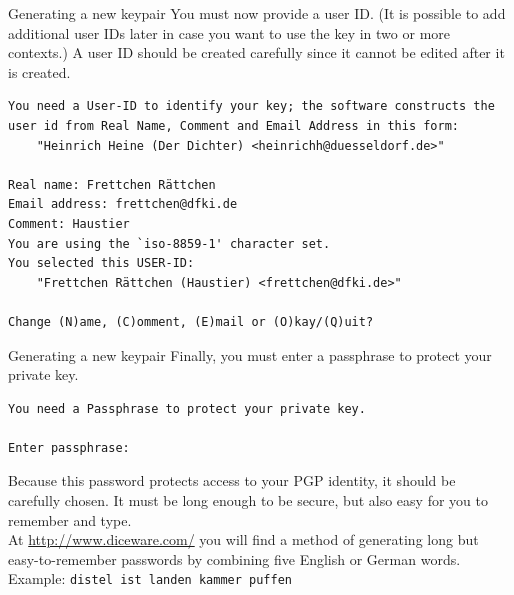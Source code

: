 \documentclass[%
mode=present,%
paper=smartboard,
size=20pt,
]{powerdot}
\begin{document}
\begin{slide}[method=direct,toc=]{Generating a new keypair}
  You must now provide a user ID.  (It is possible to add additional
  user IDs later in case you want to use the key in two or more
  contexts.) A user ID should be created carefully since it cannot be
  edited after it is created.\\[1ex]
\begin{verbatim}
You need a User-ID to identify your key; the software constructs the
user id from Real Name, Comment and Email Address in this form:
    "Heinrich Heine (Der Dichter) <heinrichh@duesseldorf.de>"

Real name: Frettchen Rättchen
Email address: frettchen@dfki.de
Comment: Haustier
You are using the `iso-8859-1' character set.
You selected this USER-ID:
    "Frettchen Rättchen (Haustier) <frettchen@dfki.de>"

Change (N)ame, (C)omment, (E)mail or (O)kay/(Q)uit?
\end{verbatim}
\end{slide}

\begin{slide}[method=direct,toc=]{Generating a new keypair}
Finally, you must enter a passphrase to protect your private key.\\[1ex]
\begin{verbatim}
You need a Passphrase to protect your private key.    

Enter passphrase: 

\end{verbatim}
Because this password protects access to your PGP identity, it should
be carefully chosen.  It must be long enough to be secure, but also
easy for you to remember and type.\\[1ex]

At \url{http://www.diceware.com/} you will find a method of generating
long but easy-to-remember passwords by combining five English or
German words.\\[1ex]

Example: \texttt{distel ist landen kammer puffen}
\end{slide}
\end{document}
